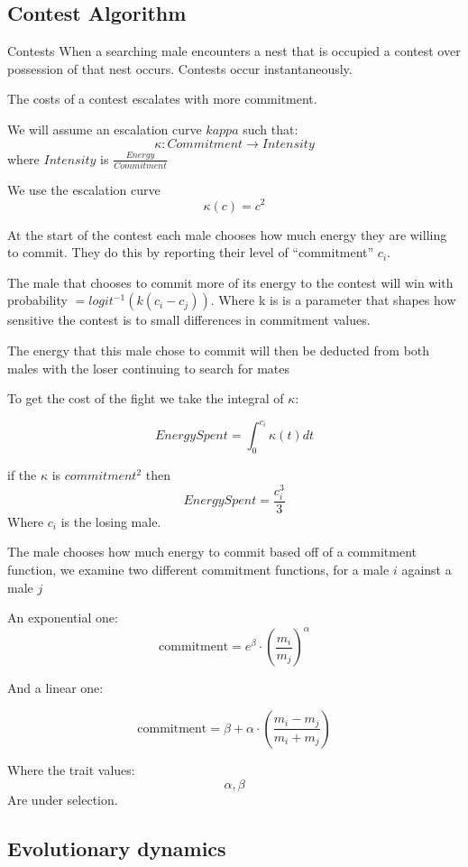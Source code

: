 \documentclass[a4paper,11pt]{article}
\begin{document}
\clearpage

\subsection{Contest Algorithm}
Contests 
When a searching male encounters a nest that is occupied a contest over possession of that nest occurs. Contests occur instantaneously. 

The costs of a contest escalates with more commitment.

We will assume an escalation curve $kappa$ such that:
$$\kappa : Commitment \rightarrow Intensity$$
where $Intensity$ is $\frac{Energy}{Commitment}$

We use the escalation curve $$ \kappa (c) = c^2 $$

At the start of the contest each male chooses how much  energy they are willing to commit.
They do this by reporting their level of ``commitment'' $c_i$.

The male that chooses to commit more of its energy to the contest will win with probability $= logit^{-1}(k(c_i - c_j))$. Where k is is a parameter that shapes how sensitive the contest is to small differences in commitment values. 

The energy that this male chose to commit will then be deducted from both males with the loser continuing to search for mates

To get the cost of the fight we take the integral of $\kappa$:

$$Energy Spent = \int_0^{c_i}{\kappa(t)}dt$$

if the $\kappa$ is $commitment^2$ then
$$EnergySpent = \frac{c_i^3}{3}$$
Where $c_i$ is the losing male.


The male chooses how much energy to commit based off of a commitment function, we examine two different commitment functions, for a male $i$ against a male $j$

An exponential one:
$$\mathrm{commitment} = e^\beta \cdot (\frac{m_i}{m_j})^\alpha $$

And a linear one:

$$\mathrm{commitment} = \beta + \alpha \cdot (\frac{m_i - m_j}{m_i + m_j})$$

Where the trait values:
$$\alpha , \beta$$
Are under selection.


\clearpage

\subsection{Evolutionary dynamics}
\end{document}
